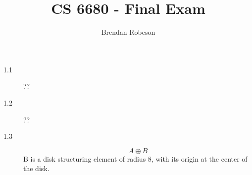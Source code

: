 \documentclass[twoside,fleqn]{article}
\begin{document}
\title{CS 6680 - Final Exam}
\author{Brendan Robeson}
\maketitle

\begin{description}
\item [1.1] ??
\item [1.2] ??
\item [1.3] \begin{equation} A \oplus B \end{equation}
B is a disk structuring element of radius 8, with its origin at the center of
the disk.
\end{description}
\end{document}
